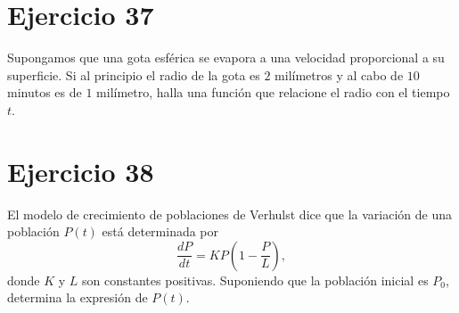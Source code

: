 \documentclass[12pt]{article}
\begin{document}
\section*{Ejercicio 37}
Supongamos que una gota esférica se evapora a una velocidad proporcional a su superficie. Si al principio el radio de la gota es $2$ milímetros y al cabo de $10$ minutos es de $1$ milímetro, halla una función que relacione el radio con el tiempo $t$.

\section*{Ejercicio 38}
El modelo de crecimiento de poblaciones de Verhulst dice que la variación de una población $P(t)$ está determinada por
\[
\frac{dP}{dt} = KP\left(1 - \frac{P}{L}\right),
\]
donde $K$ y $L$ son constantes positivas. Suponiendo que la población inicial es $P_0$, determina la expresión de $P(t)$.
\end{document}

